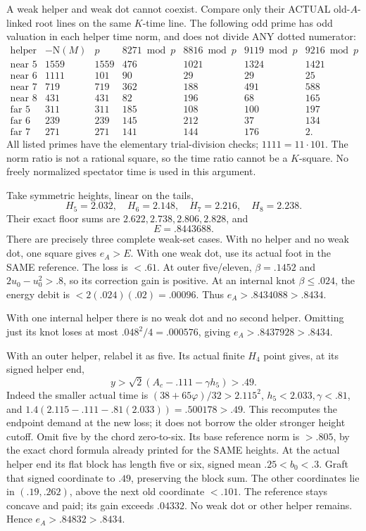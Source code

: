 \documentclass[11pt]{article}
\begin{document}
A weak helper and weak dot cannot coexist.
Compare only their ACTUAL old-\(A\)-linked
root lines on the same \(K\)-time line.
The following odd prime has odd valuation
in each helper time norm, and does not
divide ANY dotted numerator:
\[
 \begin{array}{c|r|r|rrrr}
 \text{helper}&-\mathrm N(M)&p&
           8271\bmod p&8816\bmod p&9119\bmod p&9216\bmod p\\ \hline
 \text{near }5&1559&1559&476&1021&1324&1421\\
 \text{near }6&1111&101&90&29&29&25\\
 \text{near }7&719&719&362&188&491&588\\
 \text{near }8&431&431&82&196&68&165\\
 \text{far }5&311&311&185&108&100&197\\
 \text{far }6&239&239&145&212&37&134\\
 \text{far }7&271&271&141&144&176&2 .
 \end{array}
\]
All listed primes have the elementary
trial-division checks; \(1111=11\cdot101\).
The norm ratio is not a rational square,
so the time ratio cannot be a \(K\)-square.
No freely normalized spectator time is
used in this argument.

Take symmetric heights, linear on the tails,
\[
              H_5=2.032,\quad H_6=2.148,\quad
              H_7=2.216,\quad H_8=2.238 .
\]
Their exact floor sums are
\(2.622,2.738,2.806,2.828\), and
\[
                      E=.8443688 .
\]
There are precisely three complete weak-set cases.
With no helper and no weak dot,
one square gives \(e_A>E\).
With one weak dot, use its actual foot
in the SAME reference.
The loss is \(<.61\).
At outer five/eleven, \(\beta=.1452\)
and \(2u_0-u_0^2>.8\), so its correction
gain is positive.
At an internal knot \(\beta\le.024\),
the energy debit is \(<2(.024)(.02)=.00096\).
Thus \(e_A>.8434088>.8434\).

With one internal helper there is no weak
dot and no second helper.
Omitting just its knot loses at most
\(.048^2/4=.000576\), giving
\(e_A>.8437928>.8434\).

With an outer helper, relabel it as five.
Its actual finite \(H_4\) point gives,
at its signed helper end,
\[
            y>\sqrt2(A_c-.111-\gamma h_5)>.49 .
\]
Indeed the smaller actual time is
\((38+65\varphi)/32>2.115^2\),
\(h_5<2.033,\gamma<.81\), and
\(1.4(2.115-.111-.81(2.033))=.500178>.49\).
This recomputes the endpoint demand at
the new loss; it does not borrow the
older stronger height cutoff.
Omit five by the chord zero-to-six.
Its base reference norm is \(>.805\),
by the exact chord formula already printed
for the SAME heights.
At the actual helper end its flat block
has length five or six, signed mean
\(.25<b_0<.3\).
Graft that signed coordinate to \(.49\),
preserving the block sum.
The other coordinates lie in \((.19,.262)\),
above the next old coordinate \(<.101\).
The reference stays concave and paid;
its gain exceeds \(.04332\).
No weak dot or other helper remains.
Hence \(e_A>.84832>.8434\).
\end{document}
